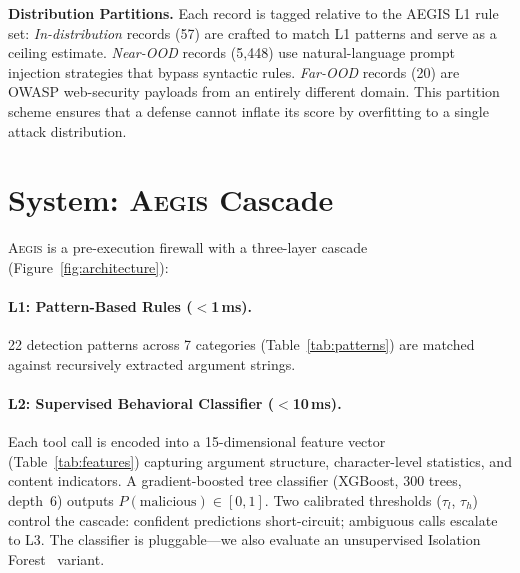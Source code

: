 \documentclass[sigconf]{acmart}
\newcommand{\system}{\textsc{Aegis}\xspace}
\begin{document}
\noindent\textbf{Distribution Partitions.}
Each record is tagged relative to the AEGIS L1 rule set:
\emph{In-distribution} records (57) are crafted to match L1 patterns and serve as a ceiling estimate.
\emph{Near-OOD} records (5{,}448) use natural-language prompt injection strategies that bypass syntactic rules.
\emph{Far-OOD} records (20) are OWASP web-security payloads from an entirely different domain.
This partition scheme ensures that a defense cannot inflate its score by overfitting to a single attack distribution.

\section{System: \system Cascade}
\label{sec:arch}

\system is a pre-execution firewall with a three-layer cascade (Figure~\ref{fig:architecture}):

\paragraph{L1: Pattern-Based Rules ($<$1\,ms).}
22 detection patterns across 7 categories (Table~\ref{tab:patterns}) are matched against recursively extracted argument strings.

\paragraph{L2: Supervised Behavioral Classifier ($<$10\,ms).}
Each tool call is encoded into a 15-dimensional feature vector (Table~\ref{tab:features}) capturing argument structure, character-level statistics, and content indicators. A gradient-boosted tree classifier (XGBoost, 300 trees, depth~6) outputs $P(\text{malicious}) \in [0,1]$. Two calibrated thresholds ($\tau_l$, $\tau_h$) control the cascade: confident predictions short-circuit; ambiguous calls escalate to L3. The classifier is pluggable---we also evaluate an unsupervised Isolation Forest~\cite{zhao2019pyod} variant.
\end{document}
